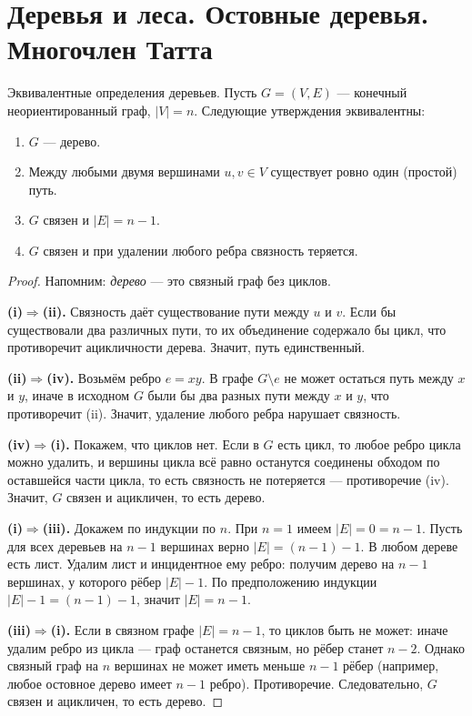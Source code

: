 
\section{Деревья и леса. Остовные деревья. Многочлен Татта}

\begin{Statement}{Эквивалентные определения деревьев.}{}
	Пусть $G=(V,E)$ — конечный неориентированный граф, $|V|=n$.
	Следующие утверждения эквивалентны:
	\begin{enumerate}
		\item[(i)] $G$ — дерево.
		\item[(ii)] Между любыми двумя вершинами $u,v\in V$ существует ровно один (простой) путь.
		\item[(iii)] $G$ связен и $|E|=n-1$.
		\item[(iv)] $G$ связен и при удалении любого ребра связность теряется.
	\end{enumerate}
\end{Statement}

\begin{proof}
	Напомним: \emph{дерево} — это связный граф без циклов.
	
	\smallskip
	\noindent\textbf{(i)$\Rightarrow$(ii).}
	Связность даёт существование пути между $u$ и $v$.
	Если бы существовали два различных пути, то их объединение содержало бы цикл, что противоречит ацикличности дерева.
	Значит, путь единственный.
	
	\smallskip
	\noindent\textbf{(ii)$\Rightarrow$(iv).}
	Возьмём ребро $e=xy$. В графе $G\setminus e$ не может остаться путь между $x$ и $y$,
	иначе в исходном $G$ были бы два разных пути между $x$ и $y$,
	что противоречит (ii). Значит, удаление любого ребра нарушает связность.
	
	\smallskip
	\noindent\textbf{(iv)$\Rightarrow$(i).}
	Покажем, что циклов нет. Если в $G$ есть цикл, то любое ребро цикла можно удалить,
	и вершины цикла всё равно останутся соединены обходом по оставшейся части цикла,
	то есть связность не потеряется — противоречие (iv). Значит, $G$ связен и ацикличен, то есть дерево.
	
	\smallskip
	\noindent\textbf{(i)$\Rightarrow$(iii).}
	Докажем по индукции по $n$. При $n=1$ имеем $|E|=0=n-1$.
	Пусть для всех деревьев на $n-1$ вершинах верно $|E|=(n-1)-1$.
	В любом дереве есть лист. Удалим лист и инцидентное ему ребро:
	получим дерево на $n-1$ вершинах, у которого рёбер $|E|-1$.
	По предположению индукции $|E|-1=(n-1)-1$, значит $|E|=n-1$.
	
	\smallskip
	\noindent\textbf{(iii)$\Rightarrow$(i).}
	Если в связном графе $|E|=n-1$, то циклов быть не может:
	иначе удалим ребро из цикла — граф останется связным, но рёбер станет $n-2$.
	Однако связный граф на $n$ вершинах не может иметь меньше $n-1$ рёбер (например, любое остовное дерево имеет $n-1$ ребро).
	Противоречие. Следовательно, $G$ связен и ацикличен, то есть дерево.

\end{proof}


